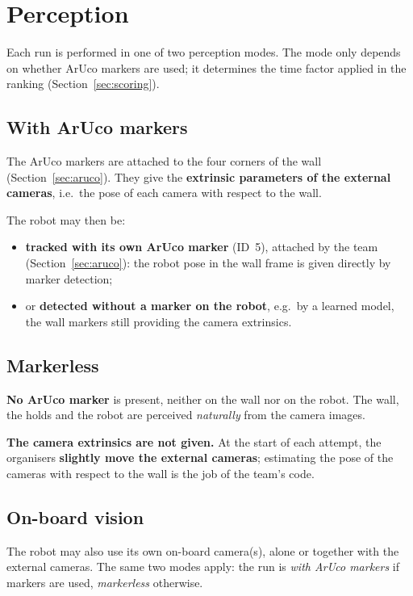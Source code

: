 \documentclass[11pt,a4paper]{article}
\begin{document}
\section{Perception}
\label{sec:perception}

Each run is performed in one of two perception modes. The mode only depends on
whether ArUco markers are used; it determines the time factor applied in the
ranking (Section~\ref{sec:scoring}).

\subsection{With ArUco markers}

The ArUco markers are attached to the four corners of the wall
(Section~\ref{sec:aruco}). They give the \textbf{extrinsic parameters of the
external cameras}, i.e.\ the pose of each camera with respect to the wall.

The robot may then be:
\begin{itemize}
  \item \textbf{tracked with its own ArUco marker}
        (ID~5), attached by the team
        (Section~\ref{sec:aruco}): the robot pose in the wall frame is given
        directly by marker detection;
  \item or \textbf{detected without a marker on the robot}, e.g.\ by a learned
        model, the wall markers still providing the camera extrinsics.
\end{itemize}

\subsection{Markerless}

\textbf{No ArUco marker} is present, neither on the wall nor on the robot. The
wall, the holds and the robot are perceived \emph{naturally} from the camera
images.

\textbf{The camera extrinsics are not given.} At the start of each attempt,
the organisers \textbf{slightly move the external cameras}; estimating the
pose of the cameras with respect to the wall is the job of the team's code.

\subsection{On-board vision}

The robot may also use its own on-board camera(s), alone or together with the
external cameras. The same two modes apply: the run is \emph{with ArUco
markers} if markers are used, \emph{markerless} otherwise.
\end{document}

